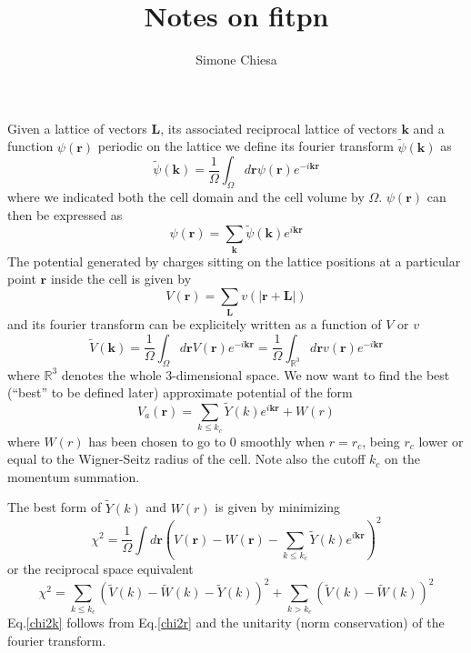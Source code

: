 \documentclass{revtex4}
\newcommand{\rv}{\mathbf{r}}
\newcommand{\kv}{\mathbf{k}}
\newcommand{\Lv}{\mathbf{L}}
\newcommand{\tV}{\widetilde{V}}
\newcommand{\tW}{\widetilde{W}}
\newcommand{\tY}{\widetilde{Y}}
\begin{document}
\title{Notes on fitpn}

\author{Simone Chiesa}

\maketitle

Given a lattice of vectors $\Lv$, its associated reciprocal
lattice of vectors $\kv$ and a function $\psi(\rv)$ periodic
on the lattice we define its fourier transform $\widetilde{\psi}(\kv)$ as
\begin{equation}
\widetilde{\psi}(\kv)=\frac{1}{\Omega}\int_\Omega d\rv \psi(\rv) e^{-i\kv\rv}
\end{equation}
where we indicated both the cell domain and the cell volume by $\Omega$. 
$\psi(\rv)$ can then be expressed as
\begin{equation}
\psi(\rv)=\sum_{\kv} \widetilde{\psi}(\kv)e^{i\kv\rv}
\end{equation}
The potential generated by charges sitting on the lattice positions
at a particular point $\rv$ inside the cell is given by
\begin{equation}
V(\rv)=\sum_{\Lv}v(|\rv+\Lv|)
\end{equation}
and its fourier transform can be explicitely written as a function of $V$ or $v$
\begin{equation}
\widetilde{V}(\kv)=\frac{1}{\Omega}\int_\Omega d\rv V(\rv) e^{-i\kv\rv}=
\frac{1}{\Omega}\int_{\mathbb{R}^3} d\rv v(\rv) e^{-i\kv\rv}
\end{equation}
where $\mathbb{R}^3$ denotes the whole 3-dimensional space.
We now want to find the best (``best'' to be defined later) approximate 
potential of the form
\begin{equation}
V_a(\rv)=\sum_{k\le k_c} \widetilde{Y}(k) e^{i\kv\rv} + W(r)
\end{equation}
where $W(r)$ has been chosen to go to $0$ smoothly when $r=r_c$, being
$r_c$ lower or equal to the Wigner-Seitz radius of the cell. Note also
the cutoff $k_c$ on the momentum summation.

The best form of $\widetilde{Y}(k)$ and $W(r)$ is given by minimizing
\begin{equation}
\chi^2=\frac{1}{\Omega}\int d\rv \left(V(\rv)-W(\rv)-
\sum_{k\le k_c}\widetilde{Y}(k)e^{i\kv\rv}\right)^2
\label{chi2r}
\end{equation}
or the reciprocal space equivalent
\begin{equation}
\chi^2=\sum_{k\le k_c}(\tV(k)-\tW(k)-\tY(k))^2+\sum_{k>k_c}(\tV(k)-\tW(k))^2
\label{chi2k}
\end{equation}
Eq.\ref{chi2k} follows from Eq.\ref{chi2r} and the unitarity
(norm conservation) of the fourier transform.
\end{document}
